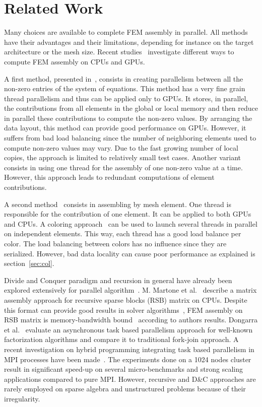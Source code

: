 \documentclass[10pt]{IOS-Book-Article}
\begin{document}
\section{Related Work}
Many choices are available to complete FEM assembly in parallel.
All methods have their advantages and their limitations, depending for instance on the target architecture or the mesh size.
Recent studies~\cite{cecka2011assembly,CPUGPUasm} investigate different ways to compute FEM assembly on CPUs and GPUs.

A first method, presented in~\cite{cecka2011assembly}, consists in creating parallelism between all the non-zero entries of the system of equations.
This method has a very fine grain thread parallelism and thus can be applied only to GPUs.
It stores, in parallel, the contributions from all elements in the global or local memory and then reduce in parallel these contributions to compute the non-zero values.
By arranging the data layout, this method can provide good performance on GPUs.
However, it suffers from bad load balancing since the number of neighboring elements used to compute non-zero values may vary.
Due to  the fast growing number of local copies, the approach is limited to relatively small test cases.
Another variant consists in using one thread for the assembly of one non-zero value at a time. However, this approach leads to redundant computations of element contributions.

A second method~\cite{cecka2011assembly} consists in assembling by mesh element. One thread is responsible for the contribution of one element.
It can be applied to both GPUs and CPUs.
A coloring approach~\cite{CUDAfe,CPUfe} can be used to launch several threads in parallel on independent elements.
This way, each thread has a good load balance per color. The load balancing between colors has no influence since they are serialized.
However, bad data locality can cause poor performance as explained is section~\ref{sec:col}.

Divide and Conquer paradigm and recursion in general have already been explored extensively for parallel algorithm~\cite{div}.
M. Martone et al.~\cite{RSBasm} describe a matrix assembly approach for recursive sparse blocks (RSB) matrix on CPUs.
Despite this format can provide good results in solver algorithms~\cite{RSBsolver}, FEM assembly on RSB matrix is memory-bandwidth bound~\cite{RSBasm} according to authors results.
Dongarra et al.~\cite{Dongarra} evaluate an asynchronous task based parallelism approach for well-known factorization algorithms and compare it to traditional fork-join approach.
A recent investigation on hybrid programming integrating task based parallelism in MPI processes have been made~\cite{MPI_task}.
The experiments done on a 1024 nodes cluster result in significant speed-up on several micro-benchmarks and strong scaling applications compared to pure MPI.
However, recursive and D\&C approaches are rarely employed on sparse algebra and unstructured problems because of their irregularity.
\end{document}
